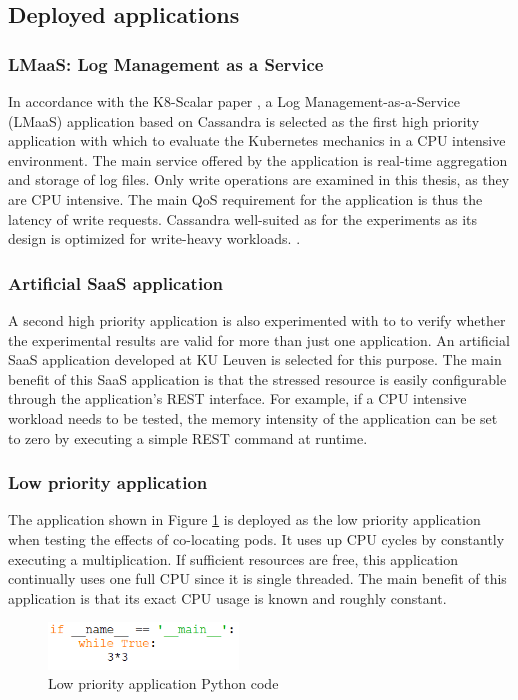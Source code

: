 \newpage

\subsection{Deployed applications}
\label{test-apps}

\subsubsection{LMaaS: Log Management as a Service}
In accordance with the K8-Scalar paper \citep{scalar}, a Log Management-as-a-Service (LMaaS) application based on Cassandra is selected as the first high priority application with which to evaluate the Kubernetes mechanics in a CPU intensive environment. The main service offered by the application is real-time aggregation and storage of log files. Only write operations are examined in this thesis, as they are CPU intensive. The main QoS requirement for the application is thus the latency of write requests. Cassandra well-suited as for the experiments as its design is optimized for write-heavy workloads. \citep{scalar}.

\subsubsection{Artificial SaaS application}
\label{setup:saas-app}
A second high priority application is also experimented with to to verify whether the experimental results are valid for more than just one application. An artificial SaaS application developed at KU Leuven \citep{saas-app} is selected for this purpose. The main benefit of this SaaS application is that the stressed resource is easily configurable through the application's REST interface. For example, if a CPU intensive workload needs to be tested, the memory intensity of the application can be set to zero by executing a simple REST command at runtime. 

\subsubsection{Low priority application}
\label{setup:lpp}
The application shown in Figure \ref{fig:cpu-app-python} is deployed as the low priority application when testing the effects of co-locating pods. It uses up CPU cycles by constantly executing a multiplication. If sufficient resources are free, this application continually uses one full CPU since it is single threaded. The main benefit of this application is that its exact CPU usage is known and roughly constant.
\newpage

\bigskip
\begin{figure}[htbp]
\centering
\includegraphics[width=0.45\textwidth]{Images/Experiments/Cpu-app.PNG}
\caption{Low priority application Python code}
\label{fig:cpu-app-python}
\end{figure}
\null
\vfill
